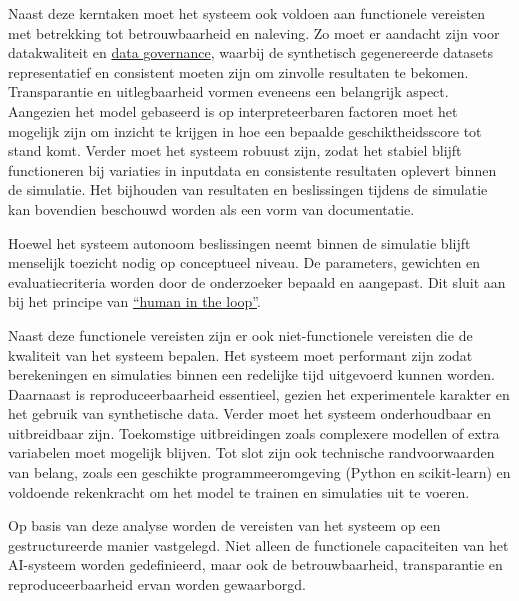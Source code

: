 Naast deze kerntaken moet het systeem ook voldoen aan functionele vereisten met betrekking tot betrouwbaarheid en naleving. Zo moet er aandacht zijn voor datakwaliteit en \href{https://www.ibm.com/think/topics/data-governance}{data governance}, waarbij de synthetisch gegenereerde datasets representatief en consistent moeten zijn om zinvolle resultaten te bekomen. Transparantie en uitlegbaarheid vormen eveneens een belangrijk aspect. Aangezien het model gebaseerd is op interpreteerbaren factoren moet het mogelijk zijn om inzicht te krijgen in hoe een bepaalde geschiktheidsscore tot stand komt. Verder moet het systeem robuust zijn, zodat het stabiel blijft functioneren bij variaties in inputdata en consistente resultaten oplevert binnen de simulatie. Het bijhouden van resultaten en beslissingen tijdens de simulatie kan bovendien beschouwd worden als een vorm van documentatie.

Hoewel het systeem autonoom beslissingen neemt binnen de simulatie blijft menselijk toezicht nodig op conceptueel niveau. De parameters, gewichten en evaluatiecriteria worden door de onderzoeker bepaald en aangepast. Dit sluit aan bij het principe van \href{https://www.ibm.com/think/topics/human-in-the-loop}{“human in the loop”}.

\vspace{1em}Naast deze functionele vereisten zijn er ook niet-functionele vereisten die de kwaliteit van het systeem bepalen. Het systeem moet performant zijn zodat berekeningen en simulaties binnen een redelijke tijd uitgevoerd kunnen worden. Daarnaast is reproduceerbaarheid essentieel, gezien het experimentele karakter en het gebruik van synthetische data. Verder moet het systeem onderhoudbaar en uitbreidbaar zijn. Toekomstige uitbreidingen zoals complexere modellen of extra variabelen moet mogelijk blijven. Tot slot zijn ook technische randvoorwaarden van belang, zoals een geschikte programmeeromgeving (Python en scikit-learn) en voldoende rekenkracht om het model te trainen en simulaties uit te voeren.

Op basis van deze analyse worden de vereisten van het systeem op een gestructureerde manier vastgelegd. Niet alleen de functionele capaciteiten van het AI-systeem worden gedefinieerd, maar ook de betrouwbaarheid, transparantie en reproduceerbaarheid ervan worden gewaarborgd.


